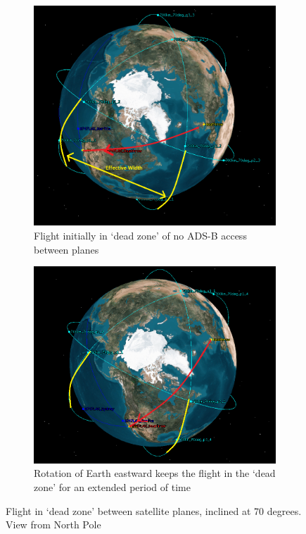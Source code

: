 \begin{figure}[htpb]
	\centering
	\begin{subfigure}[b]{0.6\textwidth}
	
	\includegraphics[width=\textwidth]{Pictures/70_deg_precess_1_edited.png}
	
	\caption{Flight initially in `dead zone' of no ADS-B access between planes}
	\label{fig:70_deg_precess_1_edited}
	\end{subfigure}
	
	\begin{subfigure}[b]{0.6\textwidth}
	\includegraphics[width=\textwidth]{Pictures/70_deg_precess_2_edited.png}
	
	
	\caption{Rotation of Earth eastward keeps the flight in the `dead zone' for an extended period of time}
	\label{fig:70_deg_precess_2_edited}
	\end{subfigure}
		
	
	\caption{Flight in `dead zone' between satellite planes, inclined at 70 degrees. View from North Pole}
\end{figure} 